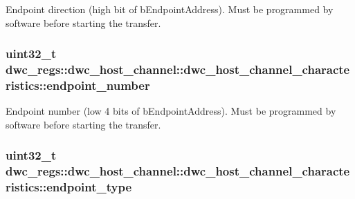 Endpoint direction (high bit of b\-Endpoint\-Address). Must be programmed by software before starting the transfer. \hypertarget{uniondwc__regs_1_1dwc__host__channel_1_1dwc__host__channel__characteristics_adf26b4829cf4b1db1ee280287f64448b}{
\subsubsection[{endpoint\-\_\-number}]{\setlength{\rightskip}{0pt plus 5cm}uint32\-\_\-t dwc\-\_\-regs\-::dwc\-\_\-host\-\_\-channel\-::dwc\-\_\-host\-\_\-channel\-\_\-characteristics\-::endpoint\-\_\-number}}\label{uniondwc__regs_1_1dwc__host__channel_1_1dwc__host__channel__characteristics_adf26b4829cf4b1db1ee280287f64448b}
Endpoint number (low 4 bits of b\-Endpoint\-Address). Must be programmed by software before starting the transfer. \hypertarget{uniondwc__regs_1_1dwc__host__channel_1_1dwc__host__channel__characteristics_ae70c9d4461e7c2286b3f7726654ee46f}{
\subsubsection[{endpoint\-\_\-type}]{\setlength{\rightskip}{0pt plus 5cm}uint32\-\_\-t dwc\-\_\-regs\-::dwc\-\_\-host\-\_\-channel\-::dwc\-\_\-host\-\_\-channel\-\_\-characteristics\-::endpoint\-\_\-type}}\label{uniondwc__regs_1_1dwc__host__channel_1_1dwc__host__channel__characteristics_ae70c9d4461e7c2286b3f7726654ee46f}
